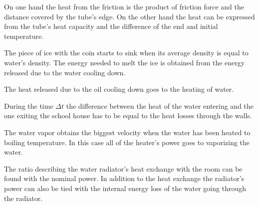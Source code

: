 \documentclass[11pt]{article}
\begin{document}
\hinteng
On one hand the heat from the friction is the product of friction force and the distance covered by the tube’s edge. On the other hand the heat can be expressed from the tube’s heat capacity and the difference of the end and initial temperature.
\probend
\bigskip


\hinteng
The piece of ice with the coin starts to sink when its average density is equal to water’s density. The energy needed to melt the ice is obtained from the energy released due to the water cooling down.
\probend
\bigskip


\hinteng
The heat released due to the oil cooling down goes to the heating of water.
\probend
\bigskip


\hinteng
During the time $\Delta t$ the difference between the heat of the water entering and the one exiting the school house has to be equal to the heat losses through the walls.
\probend
\bigskip


\hinteng
The water vapor obtains the biggest velocity when the water has been heated to boiling temperature. In this case all of the heater’s power goes to vaporizing the water.
\probend
\bigskip


\hinteng
The ratio describing the water radiator’s heat exchange with the room can be found with the nominal power. In addition to the heat exchange the radiator’s power can also be tied with the internal energy loss of the water going through the radiator.
\probend
\bigskip

\end{document}
